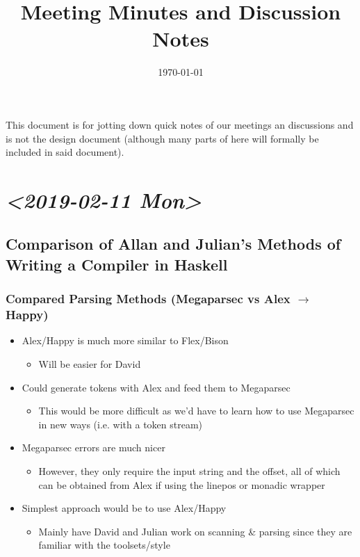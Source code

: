 \documentclass[11pt]{article}
\date{\today}
\title{Meeting Minutes and Discussion Notes}
\begin{document}
\maketitle
\tableofcontents

This document is for jotting down quick notes of our meetings an
discussions and is not the design document (although many parts of
here will formally be included in said document).
\section{\textit{<2019-02-11 Mon>}}
\label{sec:orgb90db55}
\subsection{Comparison of Allan and Julian's Methods of Writing a Compiler in Haskell}
\label{sec:org3c287fb}
\subsubsection{Compared Parsing Methods (Megaparsec vs Alex \(\to\) Happy)}
\label{sec:orgd73319a}
\begin{itemize}
\item Alex/Happy is much more similar to Flex/Bison
\begin{itemize}
\item Will be easier for David
\end{itemize}
\item Could generate tokens with Alex and feed them to Megaparsec
\begin{itemize}
\item This would be more difficult as we'd have to learn how to use
Megaparsec in new ways (i.e. with a token stream)
\end{itemize}
\item Megaparsec errors are much nicer
\begin{itemize}
\item However, they only require the input string and the offset, all of
which can be obtained from Alex if using the linepos or monadic wrapper
\end{itemize}
\item Simplest approach would be to use Alex/Happy
\begin{itemize}
\item Mainly have David and Julian work on scanning \& parsing since they
are familiar with the toolsets/style
\end{itemize}
\end{itemize}
\end{document}
